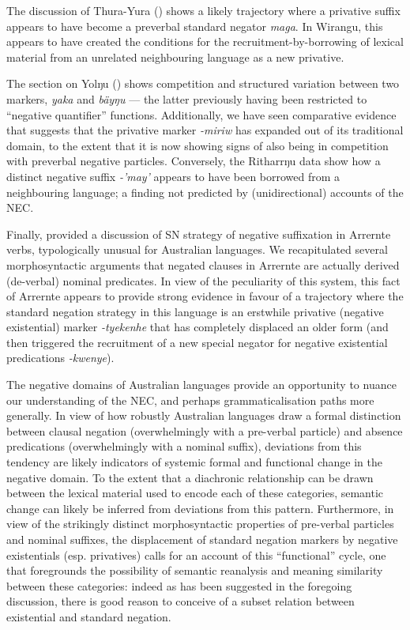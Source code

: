 \documentclass[output=paper]{langsci/langscibook}
\begin{document}
The discussion of Thura-Yura () shows a likely trajectory where a privative suffix appears to have become a preverbal standard negator \textit{maga}. In Wirangu, this appears to have created the conditions for the recruitment-by-borrowing of lexical material from an unrelated neighbouring language as a new privative.

The section on Yolŋu () shows competition and structured variation between two markers, \textit{yaka} and \textit{bäyŋu} --- the latter previously having been restricted to ``negative quantifier'' functions. Additionally, we have seen comparative evidence that suggests that the privative marker \textit{-miriw} has expanded out of its traditional domain, to the extent that it is now showing signs of also being in competition with preverbal negative particles. Conversely, the Ritharrŋu data show how a distinct negative suffix \textit{-'may'} appears to have been borrowed from a neighbouring language; a finding not predicted by (unidirectional) accounts of the NEC.

Finally,  provided a discussion of SN strategy of negative suffixation in Arrernte verbs, typologically unusual for Australian languages. We recapitulated several morphosyntactic arguments that negated clauses in Arrernte are actually derived (de-verbal) nominal predicates. In view of the peculiarity of this system, this fact of Arrernte appears to provide strong evidence in favour of a trajectory where the standard negation strategy in this language is an erstwhile privative (negative existential) marker \textit{-tye\textdblhyphen kenhe} that has completely displaced an older form (and then triggered the recruitment of a new special negator for negative existential predications \textit{-kwenye}).

The negative domains of Australian languages provide an opportunity to
    nuance our understanding of the NEC, and perhaps grammaticalisation
    paths more generally. In view of how robustly Australian languages draw
    a formal distinction between clausal negation (overwhelmingly with a
    pre-verbal particle) and absence predications (overwhelmingly with a
    nominal suffix), deviations from this tendency are likely indicators of
    systemic formal and functional change in the negative domain. To the
    extent that a diachronic relationship can be drawn between the lexical
    material used to encode each of these categories, semantic change can
    likely be inferred from deviations from this pattern. Furthermore, in
    view of the strikingly distinct morphosyntactic properties of
    pre-verbal particles and nominal suffixes, the displacement of standard
    negation markers by negative existentials (esp. privatives) calls for
    an account of this ``functional'' cycle, one that foregrounds the
    possibility of semantic reanalysis and meaning similarity between these
    categories: indeed as has been suggested in the foregoing discussion,
    there is good reason to conceive of a subset relation between
    existential and standard negation.
\end{document}
